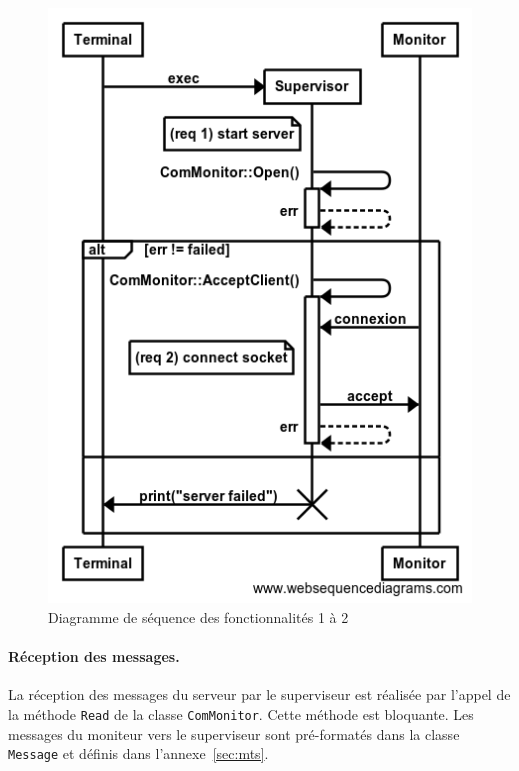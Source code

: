 
%    
\begin{figure}[htbp]
\begin{center}
\includegraphics[scale=0.4]{./seq_req/req1-2}
\caption{Diagramme de séquence des fonctionnalités 1 à 2}
\label{fig:diag1_2}
\end{center}
\end{figure}

\paragraph{Réception des messages.} La réception des messages du serveur par le superviseur est réalisée par l'appel de la méthode  {\tt Read} de la classe {\tt ComMonitor}. Cette méthode est bloquante. Les messages du moniteur vers le superviseur sont pré-formatés dans la classe {\tt Message} et définis dans l'annexe~\ref{sec:mts}.\\

